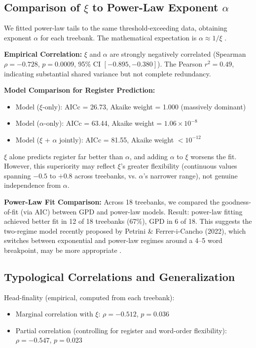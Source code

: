 \documentclass[11pt,letterpaper]{article}
\begin{document}
\subsection{Comparison of $\xi$ to Power-Law Exponent $\alpha$}

We fitted power-law tails to the same threshold-exceeding data, obtaining exponent $\alpha$ for each treebank. The mathematical expectation is $\alpha \approx 1/\xi$ \citep{Clauset2009}.

\textbf{Empirical Correlation:} $\xi$ and $\alpha$ are strongly negatively correlated (Spearman $\rho=-0.728$, $p=0.0009$, 95\% CI $[-0.895,-0.380]$). The Pearson $r^2=0.49$, indicating substantial shared variance but not complete redundancy.

\textbf{Model Comparison for Register Prediction:}
\begin{itemize}
\item Model ($\xi$-only): AICc = 26.73, Akaike weight = 1.000 (massively dominant)
\item Model ($\alpha$-only): AICc = 63.44, Akaike weight = $1.06 \times 10^{-8}$
\item Model ($\xi$ + $\alpha$ jointly): AICc = 81.55, Akaike weight $< 10^{-12}$
\end{itemize}

$\xi$ alone predicts register far better than $\alpha$, and adding $\alpha$ to $\xi$ worsens the fit. However, this superiority may reflect $\xi$'s greater flexibility (continuous values spanning $-0.5$ to $+0.8$ across treebanks, vs. $\alpha$'s narrower range), not genuine independence from $\alpha$.

\textbf{Power-Law Fit Comparison:} Across 18 treebanks, we compared the goodness-of-fit (via AIC) between GPD and power-law models. Result: power-law fitting achieved better fit in 12 of 18 treebanks (67\%), GPD in 6 of 18. This suggests the two-regime model recently proposed by Petrini \& Ferrer-i-Cancho (2022), which switches between exponential and power-law regimes around a 4--5 word breakpoint, may be more appropriate \citep{Petrini2025}.

\subsection{Typological Correlations and Generalization}

Head-finality (empirical, computed from each treebank):
\begin{itemize}
\item Marginal correlation with $\xi$: $\rho=-0.512$, $p=0.036$
\item Partial correlation (controlling for register and word-order flexibility): $\rho=-0.547$, $p=0.023$
\end{itemize}
\end{document}
